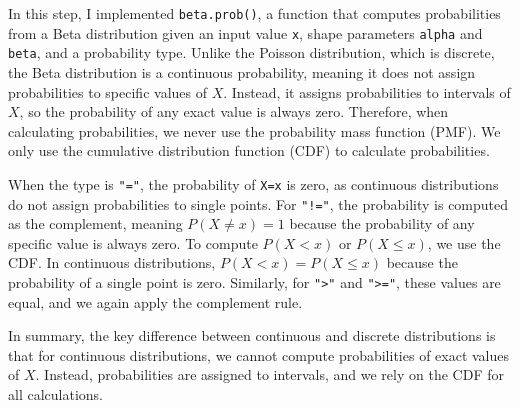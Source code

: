 \documentclass{article}\usepackage[]{graphicx}\usepackage[]{xcolor}
\begin{document}
\begin{enumerate}
In this step, I implemented \texttt{beta.prob()}, a function that computes
probabilities from a Beta distribution given an input value \texttt{x},
shape parameters \texttt{alpha} and \texttt{beta}, and a probability type.
Unlike the Poisson distribution, which is discrete, the Beta distribution is
a continuous probability, meaning it does not assign probabilities to
specific values of $X$. Instead, it assigns probabilities to intervals of $X$,
so the probability of any exact value is always zero. Therefore, when calculating 
probabilities, we never use the probability mass function (PMF). We only use the
cumulative distribution function (CDF) to calculate probabilities.


When the type is \texttt{"="}, the probability of \texttt{X=x} is zero,
as continuous distributions do not assign probabilities to single points.
For \texttt{"!="}, the probability is computed as the complement, meaning
$P(X \neq x) = 1$ because the probability of any specific value is always zero.
To compute $P(X < x)$ or $P(X \leq x)$, we use the CDF. In continuous distributions,
$P(X < x) = P(X \leq x)$ because the probability of a single point is zero.
Similarly, for \texttt{">"} and \texttt{">="}, these values are equal, and we 
again apply the complement rule.


In summary, the key difference between continuous and discrete distributions is
that for continuous distributions, we cannot compute probabilities of exact values
of $X$. Instead, probabilities are assigned to intervals, and we rely on the CDF
for all calculations.

\end{enumerate}

\end{document}
